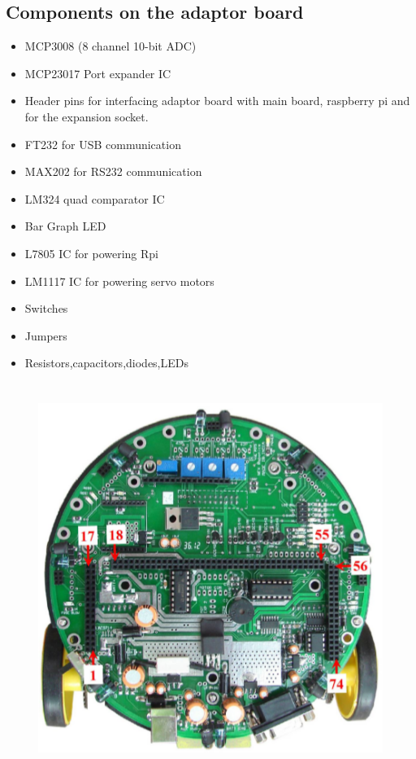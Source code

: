 \documentclass[a4paper,12pt,oneside]{book}
\begin{document}
\subsection*{\textbf{Components on the adaptor board}}
\vspace{1cm}
\begin{itemize}
	\item{MCP3008 (8 channel 10-bit ADC)}
	\item{MCP23017 Port expander IC}
	\item{Header pins for interfacing adaptor board with main board, raspberry pi and for the expansion socket.}
	\item{FT232 for USB communication}	
	\item{MAX202 for RS232 communication}
	\item{LM324 quad comparator IC}
	\item{Bar Graph LED}
	\item{L7805 IC for powering Rpi}
	\item{LM1117 IC for powering servo motors}
	\item{Switches}
    \item{Jumpers}
    \item{Resistors,capacitors,diodes,LEDs}	
\end{itemize}
\pagebreak

\section*{\textbf{\fontsize{25}{10}\selectfont{2.Main board pin details}}}
\begin{figure}[h]
	\includegraphics[width=1.\textwidth]{main_board}
\end{figure}
\end{document}
